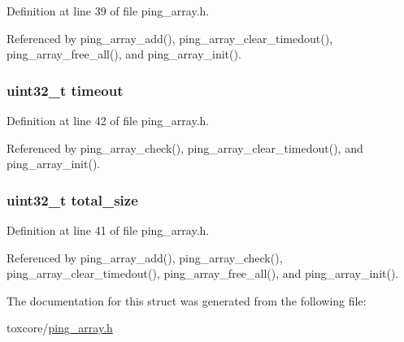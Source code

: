 Definition at line 39 of file ping\+\_\+array.\+h.



Referenced by ping\+\_\+array\+\_\+add(), ping\+\_\+array\+\_\+clear\+\_\+timedout(), ping\+\_\+array\+\_\+free\+\_\+all(), and ping\+\_\+array\+\_\+init().

\hypertarget{struct_ping___array_ab5627d8d8b095c198e2523c44ca380ac}{
\subsubsection[{timeout}]{\setlength{\rightskip}{0pt plus 5cm}uint32\+\_\+t timeout}}\label{struct_ping___array_ab5627d8d8b095c198e2523c44ca380ac}


Definition at line 42 of file ping\+\_\+array.\+h.



Referenced by ping\+\_\+array\+\_\+check(), ping\+\_\+array\+\_\+clear\+\_\+timedout(), and ping\+\_\+array\+\_\+init().

\hypertarget{struct_ping___array_acdfd526bb392e1ee59a3c6c545891b48}{
\subsubsection[{total\+\_\+size}]{\setlength{\rightskip}{0pt plus 5cm}uint32\+\_\+t total\+\_\+size}}\label{struct_ping___array_acdfd526bb392e1ee59a3c6c545891b48}


Definition at line 41 of file ping\+\_\+array.\+h.



Referenced by ping\+\_\+array\+\_\+add(), ping\+\_\+array\+\_\+check(), ping\+\_\+array\+\_\+clear\+\_\+timedout(), ping\+\_\+array\+\_\+free\+\_\+all(), and ping\+\_\+array\+\_\+init().



The documentation for this struct was generated from the following file\+:\begin{DoxyCompactItemize}
\item 
toxcore/\hyperlink{ping__array_8h}{ping\+\_\+array.\+h}\end{DoxyCompactItemize}
